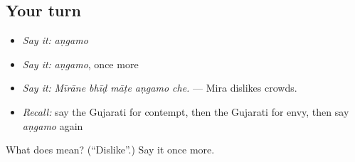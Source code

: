 \subsection*{Your turn}
\begin{itemize}
\raggedright
  \item \emph{Say it:} \emph{aṇgamo}
  \item \emph{Say it:} \emph{aṇgamo}, once more
  \item \emph{Say it:} \emph{Mīrāne bhīḍ māṭe aṇgamo che.} — Mira dislikes crowds.
  \item \emph{Recall:} say the Gujarati for contempt, then the Gujarati for envy, then say \emph{aṇgamo} again
\end{itemize}

\begin{tcolorbox}[breakable,colback=teal!4,colframe=teal!35!black,title={Before you move on}]
What does  mean? (\textquotedblleft{}Dislike\textquotedblright{}.) Say it once more.
\end{tcolorbox}
